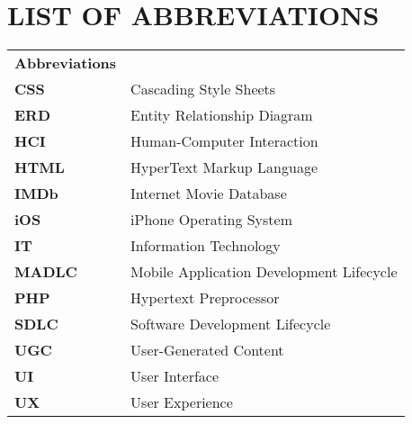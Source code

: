 \chapter{LIST OF ABBREVIATIONS}

\par\noindent
\vspace{2cm}
\begin{tabular}{@{}p{30mm}l@{}}
\textbf{Abbreviations}  & \\
\textbf{CSS}                    & Cascading Style Sheets \\
\textbf{ERD}                    & Entity Relationship Diagram \\
\textbf{HCI}                    & Human-Computer Interaction \\
\textbf{HTML}                   & HyperText Markup Language \\
\textbf{IMDb}                   & Internet Movie Database \\
\textbf{iOS}                    & iPhone Operating System \\
\textbf{IT}                     & Information Technology \\
\textbf{MADLC}                  & Mobile Application Development Lifecycle \\
\textbf{PHP}                    & Hypertext Preprocessor \\
\textbf{SDLC}                   & Software Development Lifecycle \\
\textbf{UGC}                    & User-Generated Content \\
\textbf{UI}                     & User Interface \\
\textbf{UX}                     & User Experience
\end{tabular}


